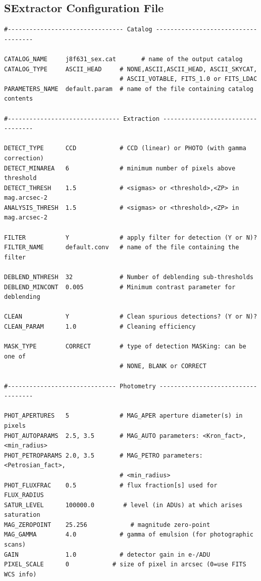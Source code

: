 \documentclass[a4paper,10pt]{article}
\begin{document}
\subsection{SExtractor Configuration File}
\begin{footnotesize}
\begin{verbatim}
#-------------------------------- Catalog ------------------------------------
 
CATALOG_NAME     j8f631_sex.cat       # name of the output catalog
CATALOG_TYPE     ASCII_HEAD     # NONE,ASCII,ASCII_HEAD, ASCII_SKYCAT,
                                # ASCII_VOTABLE, FITS_1.0 or FITS_LDAC
PARAMETERS_NAME  default.param  # name of the file containing catalog contents
 
#------------------------------- Extraction ----------------------------------
 
DETECT_TYPE      CCD            # CCD (linear) or PHOTO (with gamma correction)
DETECT_MINAREA   6              # minimum number of pixels above threshold
DETECT_THRESH    1.5            # <sigmas> or <threshold>,<ZP> in mag.arcsec-2
ANALYSIS_THRESH  1.5            # <sigmas> or <threshold>,<ZP> in mag.arcsec-2
 
FILTER           Y              # apply filter for detection (Y or N)?
FILTER_NAME      default.conv   # name of the file containing the filter
 
DEBLEND_NTHRESH  32             # Number of deblending sub-thresholds
DEBLEND_MINCONT  0.005          # Minimum contrast parameter for deblending
 
CLEAN            Y              # Clean spurious detections? (Y or N)?
CLEAN_PARAM      1.0            # Cleaning efficiency
 
MASK_TYPE        CORRECT        # type of detection MASKing: can be one of
                                # NONE, BLANK or CORRECT
 
#------------------------------ Photometry -----------------------------------
 
PHOT_APERTURES   5              # MAG_APER aperture diameter(s) in pixels
PHOT_AUTOPARAMS  2.5, 3.5       # MAG_AUTO parameters: <Kron_fact>,<min_radius>
PHOT_PETROPARAMS 2.0, 3.5       # MAG_PETRO parameters: <Petrosian_fact>,
                                # <min_radius>
PHOT_FLUXFRAC    0.5            # flux fraction[s] used for FLUX_RADIUS
SATUR_LEVEL      100000.0        # level (in ADUs) at which arises saturation
MAG_ZEROPOINT    25.256            # magnitude zero-point
MAG_GAMMA        4.0            # gamma of emulsion (for photographic scans)
GAIN             1.0            # detector gain in e-/ADU
PIXEL_SCALE      0            # size of pixel in arcsec (0=use FITS WCS info)
 

\end{verbatim}
\end{footnotesize}
\end{document}
